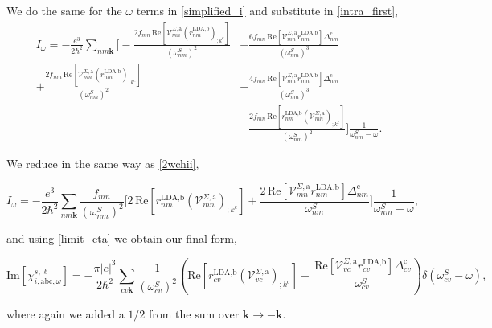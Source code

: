 We do the same for the $\omega$ terms in \eqref{simplified_i} and substitute in \eqref{intra_first},
\begin{align}\label{wchii}
I_{\omega}
= -\frac{e^3}{2\hbar^2}\sum_{nm\mathbf{k}}
\Biggl[
 - \frac{2f_{mn}\,\mathrm{Re}\left[\mathcal{V}^{\Sigma,\text{a}}_{mn}\left(r^{\text{LDA,b}}_{nm}\right)_{;k^{\text{c}}}\right]}{(\omega^{S}_{nm})^{2}}
&+ \frac{6f_{mn}\,\mathrm{Re}\left[\mathcal{V}^{\Sigma,\text{a}}_{mn}r^{\text{LDA,b}}_{nm}\right]\Delta^{\text{c}}_{nm}}{(\omega^{S}_{nm})^{3}}\nonumber\\
 + \frac{2f_{mn}\,\mathrm{Re}\left[\mathcal{V}^{\Sigma,\text{a}}_{mn}\left(r^{\text{LDA,b}}_{nm}\right)_{;k^{\text{c}}}\right]}{(\omega^{S}_{nm})^{2}}
&- \frac{4f_{mn}\,\mathrm{Re}\left[\mathcal{V}^{\Sigma,\text{a}}_{nm}r^{\text{LDA,b}}_{mn}\right]\Delta_{nm}^{\text{c}}}{(\omega^{S}_{nm})^{3}}\nonumber\\
&+ \frac{2f_{mn}\,\mathrm{Re}\left[r^{\text{LDA,b}}_{nm}\left(\mathcal{V}^{\Sigma,\text{a}}_{mn}\right)_{;k^{\text{c}}}\right]}{(\omega^{S}_{nm})^{2}}
\Biggr]\frac{1}{\omega^{S}_{nm}-\omega}.
\end{align}

We reduce in the same way as \eqref{2wchii}, %

\begin{equation}\label{wchii_simplified}
I_{\omega}
= -\frac{e^3}{2\hbar^2}\sum_{nm\mathbf{k}}\frac{f_{mn}}{(\omega^{S}_{nm})^{2}}
\Biggl[
2\,\mathrm{Re}\left[r^{\text{LDA,b}}_{nm}\left(\mathcal{V}^{\Sigma,\text{a}}_{mn}\right)_{;k^{\text{c}}}\right]
+\frac{2\,\mathrm{Re}\left[\mathcal{V}^{\Sigma,\text{a}}_{mn}r^{\text{LDA,b}}_{nm}\right]\Delta^{\text{c}}_{nm}}{\omega^{S}_{nm}} 
\Biggr]\frac{1}{\omega^{S}_{nm}-\omega},
\end{equation}

and using \eqref{limit_eta} we obtain our final form,

\begin{equation}
\mathrm{Im}[\chi_{i,\text{a}\text{b}\text{c},\omega}^{s,\ell}]
= -\frac{\pi\vert e\vert^3}{2\hbar^2}\sum_{cv\mathbf{k}}\frac{1}{(\omega^{S}_{cv})^{2}}
\left(
\mathrm{Re}\left[r^{\text{LDA,b}}_{cv}\left(\mathcal{V}^{\Sigma,\text{a}}_{vc}\right)_{;k^{\text{c}}}\right]
+\frac{\,\mathrm{Re}\left[\mathcal{V}^{\Sigma,\text{a}}_{vc}r^{\text{LDA,b}}_{cv}\right]\Delta^{\text{c}}_{cv}}{\omega^{S}_{cv}} 
\right)\delta(\omega^{S}_{cv}-\omega),
\end{equation}

where again we added a $1/2$ from the sum over $\mathbf{k} \rightarrow - \mathbf{k}$.
